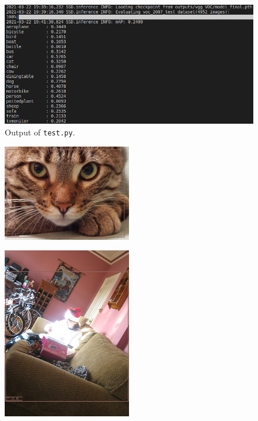 \begin{figure}[h!]
  \centering
  \includegraphics[width=\textwidth]{figures/Task4f_map.png}
  \caption{Output of \texttt{test.py}.}
  \label{fig:task4:f_map}
\end{figure}

\begin{figure}[h!]
  \centering
  \includegraphics[width=0.5\textwidth]{figures/000542.png}
\end{figure}

\begin{figure}[h!]
  \centering
  \includegraphics[width=0.5\textwidth]{figures/004101.png}
\end{figure}

